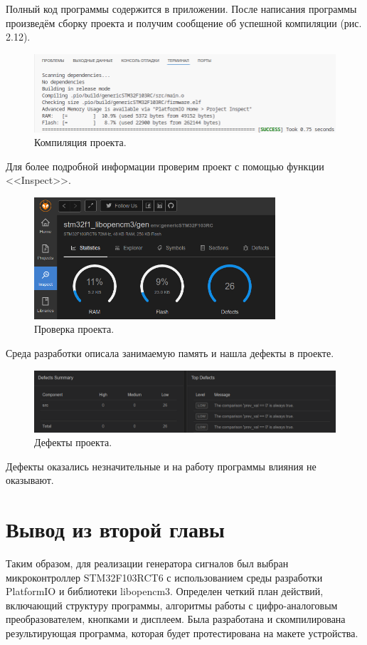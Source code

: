 	Полный код программы содержится в приложении. После написания программы произведём сборку проекта и получим сообщение об успешной компиляции (рис. 2.12).
	
	\begin{figure}[H]
    \centering
    \includegraphics[width=1\textwidth]{../image/compile.png}
    \caption{Компиляция проекта.}
	\end{figure}
	
	Для более подробной информации проверим проект с помощью функции <<Inspect>>.
	
	\begin{figure}[H]
    \centering
    \includegraphics[width=0.8\textwidth]{../image/inspect.png}
    \caption{Проверка проекта.}
	\end{figure}
	
	Среда разработки описала занимаемую память и нашла дефекты в проекте.
	
	\begin{figure}[H]
    \centering
    \includegraphics[width=1\textwidth]{../image/defects.png}
    \caption{Дефекты проекта.}
	\end{figure}
	
	Дефекты оказались незначительные и на работу программы влияния не оказывают.
	
\section{Вывод из второй главы}
	
	Таким образом, для реализации генератора сигналов был выбран микроконтроллер STM32F103RCT6 с использованием среды разработки PlatformIO и библиотеки libopencm3. Определен четкий план действий, включающий структуру программы, алгоритмы работы с цифро-аналоговым преобразователем, кнопками и дисплеем. Была разработана и скомпилирована результирующая программа, которая будет протестирована на макете устройства.

	
	
